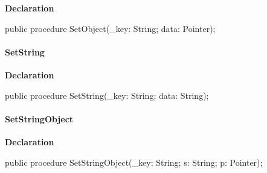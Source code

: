 \documentclass{report}
\newif\ifpdf
\begin{document}
\label{PasDoc_Hashes.THash-SetObject}
\begin{list}{}{
\setlength{\itemindent}{0cm}
\setlength{\listparindent}{0cm}
\setlength{\leftmargin}{\evensidemargin}
\addtolength{\leftmargin}{\tmplength}
\settowidth{\labelsep}{X}
\addtolength{\leftmargin}{\labelsep}
\setlength{\labelwidth}{\tmplength}
}
\item[\textbf{Declaration}\hfill]
\ifpdf
\begin{flushleft}
\fi
\begin{ttfamily}
public procedure SetObject({\_}key: String; data: Pointer);\end{ttfamily}

\ifpdf
\end{flushleft}
\fi

\end{list}
\paragraph*{SetString}\hspace*{\fill}

\label{PasDoc_Hashes.THash-SetString}
\begin{list}{}{
\setlength{\itemindent}{0cm}
\setlength{\listparindent}{0cm}
\setlength{\leftmargin}{\evensidemargin}
\addtolength{\leftmargin}{\tmplength}
\settowidth{\labelsep}{X}
\addtolength{\leftmargin}{\labelsep}
\setlength{\labelwidth}{\tmplength}
}
\item[\textbf{Declaration}\hfill]
\ifpdf
\begin{flushleft}
\fi
\begin{ttfamily}
public procedure SetString({\_}key: String; data: String);\end{ttfamily}

\ifpdf
\end{flushleft}
\fi

\end{list}
\paragraph*{SetStringObject}\hspace*{\fill}

\label{PasDoc_Hashes.THash-SetStringObject}
\begin{list}{}{
\setlength{\itemindent}{0cm}
\setlength{\listparindent}{0cm}
\setlength{\leftmargin}{\evensidemargin}
\addtolength{\leftmargin}{\tmplength}
\settowidth{\labelsep}{X}
\addtolength{\leftmargin}{\labelsep}
\setlength{\labelwidth}{\tmplength}
}
\item[\textbf{Declaration}\hfill]
\ifpdf
\begin{flushleft}
\fi
\begin{ttfamily}
public procedure SetStringObject({\_}key: String; s: String; p: Pointer);\end{ttfamily}

\ifpdf
\end{flushleft}
\fi

\end{list}
\end{document}
